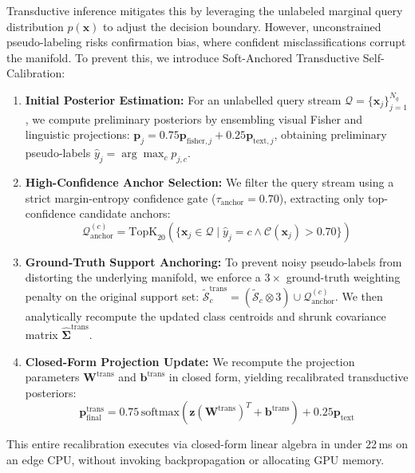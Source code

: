\documentclass[conference]{IEEEtran}
\begin{document}
Transductive inference mitigates this by leveraging the unlabeled marginal query distribution $p(\mathbf{x})$ to adjust the decision boundary. However, unconstrained pseudo-labeling risks confirmation bias, where confident misclassifications corrupt the manifold. To prevent this, we introduce Soft-Anchored Transductive Self-Calibration:
\begin{enumerate}
    \item \textbf{Initial Posterior Estimation:} For an unlabelled query stream $\mathcal{Q} = \{\mathbf{x}_j\}_{j=1}^{N_q}$, we compute preliminary posteriors by ensembling visual Fisher and linguistic projections: $\mathbf{p}_j = 0.75 \mathbf{p}_{\text{fisher}, j} + 0.25 \mathbf{p}_{\text{text}, j}$, obtaining preliminary pseudo-labels $\hat{y}_j = \arg\max_c p_{j, c}$.
    \item \textbf{High-Confidence Anchor Selection:} We filter the query stream using a strict margin-entropy confidence gate ($\tau_{\text{anchor}} = 0.70$), extracting only top-confidence candidate anchors:
    \begin{equation}
    \mathcal{Q}_{\text{anchor}}^{(c)} = \text{TopK}_{20}\left(\{\mathbf{x}_j \in \mathcal{Q} \mid \hat{y}_j = c \land \mathcal{C}(\mathbf{x}_j) > 0.70\}\right)
    \end{equation}
    \item \textbf{Ground-Truth Support Anchoring:} To prevent noisy pseudo-labels from distorting the underlying manifold, we enforce a $3\times$ ground-truth weighting penalty on the original support set: $\tilde{\mathcal{S}}_c^{\text{trans}} = (\tilde{\mathcal{S}}_c \otimes 3) \cup \mathcal{Q}_{\text{anchor}}^{(c)}$. We then analytically recompute the updated class centroids and shrunk covariance matrix $\hat{\mathbf{\Sigma}}^{\text{trans}}$.
    \item \textbf{Closed-Form Projection Update:} We recompute the projection parameters $\mathbf{W}^{\text{trans}}$ and $\mathbf{b}^{\text{trans}}$ in closed form, yielding recalibrated transductive posteriors:
    \begin{equation}
    \mathbf{p}_{\text{final}}^{\text{trans}} = 0.75 \, \text{softmax}\left(\mathbf{z} (\mathbf{W}^{\text{trans}})^T + \mathbf{b}^{\text{trans}}\right) + 0.25 \mathbf{p}_{\text{text}}
    \end{equation}
\end{enumerate}
This entire recalibration executes via closed-form linear algebra in under 22\,ms on an edge CPU, without invoking backpropagation or allocating GPU memory.
\end{document}
